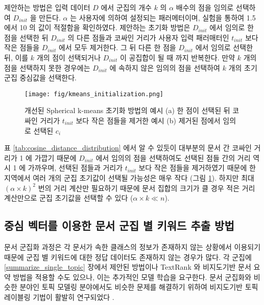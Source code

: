 \documentclass[oneside, ko,phd]{snuthesis_utf8_kor}
\begin{document}
제안하는 방법은 입력 데이터 $D$ 에서 군집의 개수 $k$ 의 $\alpha$ 배수의 점을 임의로 선택하여 $D_{init}$ 을 만든다.
$\alpha$ 는 사용자에 의하여 설정되는 패러메터이며, 실험을 통하여 1.5 에서 10 의 값이 적절함을 확인하였다.
제안하는 초기화 방법은 $D_{init}$ 에서 임의로 한 점을 선택한 뒤 $D_{init}$ 의 다른 점들과 코싸인 거리가 사용자 입력 패러매터인 $t_{init}$ 보다 작은 점들을 $D_{init}$ 에서 모두 제거한다.
그 뒤 다른 한 점을 $D_{init}$ 에서 임의로 선택한 뒤, 이를 $k$ 개의 점이 선택되거나 $D_{init}$ 이 공집합이 될 때 까지 반복한다.
만약 $k$ 개의 점을 선택하지 못한 경우에는 $D_{init}$ 에 속하지 않은 임의의 점을 선택하여 $k$ 개의 초기 군집 중심값을 선택한다. 

\begin{figure}[H]
\centering
\texttt{[image: fig/kmeans\_initialization.png]}
\caption{개선된 Spherical k-means 초기화 방법의 예시 (a) 한 점이 선택된 뒤 코싸인 거리가 $t_{init}$ 보다 작은 점들을 제거한 예시 (b) 제거된 점에서 임의로 선택된 $c_i$}
\label{fig:initialization}
\end{figure}

표 \ref{tab:cosine_distance_distribution} 에서 알 수 있듯이 대부분의 문서 간 코싸인 거리가 1 에 가깝기 때문에 $D_{init}$ 에서 임의의 점을 선택하여도 선택된 점들 간의 거리 역시 1 에 가까우며, 선택된 점들과 거리가 $t_{init}$ 보다 작은 점들을 제거하였기 때문에 한 지역에서 여러 개의 군집 초기값이 선택될 가능성은 매우 작다 (그림 \ref{fig:initialization}).
하지만 최대 $(\alpha \times k)^2$ 번의 거리 계산만 필요하기 때문에 문서 집합의 크기가 클 경우 적은 거리 계산만으로 군집 초기값을 선택할 수 있다 ($\alpha \times k \ll n$).


\subsection{중심 벡터를 이용한 문서 군집 별 키워드 추출 방법}

문서 군집화 과정은 각 문서가 속한 클래스의 정보가 존재하지 않는 상황에서 이용되기 때문에 군집 별 키워드에 대한 정답 데이터도 존재하지 않는 경우가 많다.
각 군집에 \ref{summarize_single_topic} 장에서 제안된 방법이나 TextRank 와 비지도기반 문서 요약 방법을 적용할 수도 있으나, 이는 추가적인 모델 학습을 요구한다.
문서 군집화와 비슷한 분야인 토픽 모델링 분야에서도 비슷한 문제를 해결하기 위하여 비지도기반 토픽 레이블링 기법이 활발히 연구되었다 \cite{newman2010evaluating, sievert2014ldavis, chuang2012interpretation, snyder2013topic, chuang2012termite, blei2003latent}.
\end{document}
